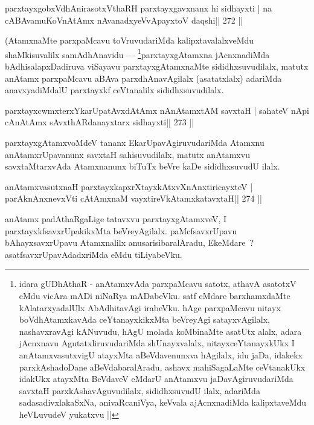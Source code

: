 \begin{shl}
parxtayxgobxVdhAnirasotxV\s thaRH parxtayxgavxnanx hi sidhayxti |
na cABAvamuKoV\s nAtAmx nAvanadxyeVvApayxtoV daqshi\hfill || 272 ||
\end{shl}

\begin{artha}
(AtamxnaMte parxpaMcavu toVruvudariMda kalipxtavalalxveMdu shaMkisuvalilx samAdhAnavidu {\rm ---}  \footnote[3]{idara gUDhAthaR - anAtamxvAda parxpaMcavu satotx, athavA asatotxV eMdu vicAra mADi niNaRya mADabeVku. satf eMdare barxhamxdaMte kAlatarxyadalUlx AbAdhitavAgi irabeVku. hAge parxpaMcavu nitayx boVdhAtamxkavAda ceYtanayxkikxMta beVreyAgi satayxvAgilalx, nashavxravAgi kANuvudu, hAgU molada koMbinaMte asatUtx alalx, adara jAcnxnavu AgutatxliruvudariMda shUnayxvalalx, nitayxceYtanayxkUkx I anAtamxvasutxvigU atayxMta aBeVdavenunxva hAgilalx, idu jaDa, idakekx parxkAshadoDane aBeVdabaralAradu, ashavx mahiSagaLaMte ceVtanakUkx idakUkx atayxMta BeVdaveV eMdarU anAtamxvu jaDavAgiruvudariMda savxtaH parxkAshavAguvudilalx, sididhxsuvudU ilalx, adariMda sadasadivxlakaSxNa, anivaRcaniVya, keVvala ajAcnxnadiMda kalipxtaveMdu heVLuvudeV yukatxvu ||}parxtayxgAtamxna jAcnxnadiMda bAdhisalapxDadiruva viSayavu parxtayxgAtamxnaMte sididhxsuvudilalx, matutx anAtamx parxpaMcavu aBAva parxdhAnavAgilalx (asatatxlalx) adariMda anavxyadiMdalU parxtayxkf ceVtanalilx sididhxsuvudilalx.
\end{artha}


\begin{shl}
parxtayxcwmxterxYkarUpatAvxdAtAmx nAnAtamxtAM savxtaH |
sahateV nApi cAnAtAmx sAvxthARdanayxtarx sidhayxti\hfill || 273 ||
\end{shl}

\begin{artha}
parxtayxgAtamxvoMdeV tananx EkarUpavAgiruvudariMda Atamxnu anAtamxrUpavanunx savxtaH sahisuvudilalx, matutx anAtamxvu savxtaMtarxvAda Atamxnanunx biTuTx beVre kaDe sididhxsuvudU ilalx.
\end{artha}

\begin{shl}
anAtamxvasutxnaH parxtayxkapxrXtayxkAtxvXnAnxtiricayxteV |
parAknAnxnevxVti cA\s\s tAmxnaM vayxtireVkAtamxkatavxtaH\hfill || 274 ||
\end{shl}

\begin{artha}
anAtamx padAthaRgaLige tatavxvu parxtayxgAtamxveV, I parxtayxkfsavxrUpakikxMta beVreyAgilalx. paMcfsavxrUpavu bAhayxsavxrUpavu Atamxnalilx anusarisibaralAradu, EkeMdare~? asatfsavxrUpavAdadxriMda eMdu tiLiyabeVku.
\end{artha}

